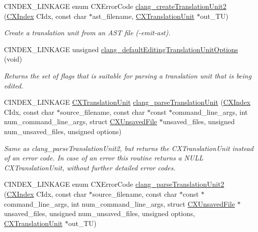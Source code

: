 \begin{DoxyCompactItemize}
C\+I\+N\+D\+E\+X\+\_\+\+L\+I\+N\+K\+A\+GE enum C\+X\+Error\+Code \hyperlink{group__CINDEX__TRANSLATION__UNIT_ga749a8220b23a06ba2fdcbea06d6bb211}{clang\+\_\+create\+Translation\+Unit2} (\hyperlink{group__CINDEX_gae039c2574bfd75774ca7a9a3e55910cb}{C\+X\+Index} C\+Idx, const char $\ast$ast\+\_\+filename, \hyperlink{group__CINDEX_gacdb7815736ca709ce9a5e1ec2b7e16ac}{C\+X\+Translation\+Unit} $\ast$out\+\_\+\+TU)
\begin{DoxyCompactList}\small\item\em Create a translation unit from an A\+ST file ({\ttfamily -\/emit-\/ast}). \end{DoxyCompactList}\item 
C\+I\+N\+D\+E\+X\+\_\+\+L\+I\+N\+K\+A\+GE unsigned \hyperlink{group__CINDEX__TRANSLATION__UNIT_ga35cfcf8b5c2c15247e476c4e47c2d37d}{clang\+\_\+default\+Editing\+Translation\+Unit\+Options} (void)
\begin{DoxyCompactList}\small\item\em Returns the set of flags that is suitable for parsing a translation unit that is being edited. \end{DoxyCompactList}\item 
\mbox{\label{group__CINDEX__TRANSLATION__UNIT_ga2baf83f8c3299788234c8bce55e4472e}} 
C\+I\+N\+D\+E\+X\+\_\+\+L\+I\+N\+K\+A\+GE \hyperlink{group__CINDEX_gacdb7815736ca709ce9a5e1ec2b7e16ac}{C\+X\+Translation\+Unit} \hyperlink{group__CINDEX__TRANSLATION__UNIT_ga2baf83f8c3299788234c8bce55e4472e}{clang\+\_\+parse\+Translation\+Unit} (\hyperlink{group__CINDEX_gae039c2574bfd75774ca7a9a3e55910cb}{C\+X\+Index} C\+Idx, const char $\ast$source\+\_\+filename, const char $\ast$const $\ast$command\+\_\+line\+\_\+args, int num\+\_\+command\+\_\+line\+\_\+args, struct \hyperlink{structCXUnsavedFile}{C\+X\+Unsaved\+File} $\ast$unsaved\+\_\+files, unsigned num\+\_\+unsaved\+\_\+files, unsigned options)
\begin{DoxyCompactList}\small\item\em Same as {\ttfamily clang\+\_\+parse\+Translation\+Unit2}, but returns the {\ttfamily C\+X\+Translation\+Unit} instead of an error code. In case of an error this routine returns a {\ttfamily N\+U\+LL} {\ttfamily C\+X\+Translation\+Unit}, without further detailed error codes. \end{DoxyCompactList}\item 
C\+I\+N\+D\+E\+X\+\_\+\+L\+I\+N\+K\+A\+GE enum C\+X\+Error\+Code \hyperlink{group__CINDEX__TRANSLATION__UNIT_ga494de0e725c5ae40cbdea5fa6081027d}{clang\+\_\+parse\+Translation\+Unit2} (\hyperlink{group__CINDEX_gae039c2574bfd75774ca7a9a3e55910cb}{C\+X\+Index} C\+Idx, const char $\ast$source\+\_\+filename, const char $\ast$const $\ast$command\+\_\+line\+\_\+args, int num\+\_\+command\+\_\+line\+\_\+args, struct \hyperlink{structCXUnsavedFile}{C\+X\+Unsaved\+File} $\ast$unsaved\+\_\+files, unsigned num\+\_\+unsaved\+\_\+files, unsigned options, \hyperlink{group__CINDEX_gacdb7815736ca709ce9a5e1ec2b7e16ac}{C\+X\+Translation\+Unit} $\ast$out\+\_\+\+TU)

\end{DoxyCompactItemize}
